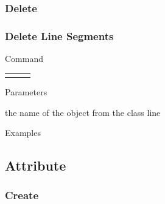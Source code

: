 \documentclass[9pt]{beamer}
\begin{document}
\subsubsection{Delete}

\begin{frame}[t] \frametitle{Delete Line Segments}

	\begin{block}{Command} 
		\begin{tabularx}{\textwidth}{@{}l@{}l@{}R}
			 &
			  	 & \InstrItem
		\end{tabularx}
	\end{block}

	\begin{block}{Parameters} \begin{itemize}
		   the name of the object from the class line
	\end{itemize} \end{block}

	\begin{block}{Examples}
	\end{block}

\end{frame}

\subsection{Attribute}

\subsubsection{Create}
\end{document}
